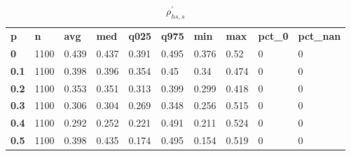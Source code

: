 \begin{table}[h]
 \centering 
\footnotesize
\caption{$\rho_{hs,s}^\prime $}
\label{tab:alphahss}
\begin{tabular}[h]{| l l l l l l l l l l|
    } \hline
\textbf{ p} & \textbf{ n} & \textbf{ avg} & \textbf{ med} & \textbf{ q025} & \textbf{ q975} & \textbf{ min} & \textbf{ max} & \textbf{ pct\_0} & \textbf{ pct\_nan}
           \\
  \textbf{  0} & 1100 & 0.439 & 0.437 & 0.391 & 0.495 & 0.376 &  0.52 & 0 & 0
           \\
  \textbf{0.1} & 1100 & 0.398 & 0.396 & 0.354 &  0.45 &  0.34 & 0.474 & 0 & 0
           \\
  \textbf{0.2} & 1100 & 0.353 & 0.351 & 0.313 & 0.399 & 0.299 & 0.418 & 0 & 0
           \\
  \textbf{0.3} & 1100 & 0.306 & 0.304 & 0.269 & 0.348 & 0.256 & 0.515 & 0 & 0
           \\
  \textbf{0.4} & 1100 & 0.292 & 0.252 & 0.221 & 0.491 & 0.211 & 0.524 & 0 & 0
           \\
  \textbf{0.5} & 1100 & 0.398 & 0.435 & 0.174 & 0.495 & 0.154 & 0.519 & 0 & 0
           \\
 \hline \end{tabular}
 \end{table}

